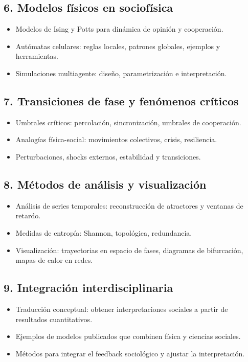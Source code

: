 \documentclass[a4paper,11pt]{article}
\begin{document}
\subsection*{6. Modelos físicos en sociofísica}
\begin{itemize}[leftmargin=*, label=--]
    \item Modelos de Ising y Potts para dinámica de opinión y cooperación.
    \item Autómatas celulares: reglas locales, patrones globales, ejemplos y herramientas.
    \item Simulaciones multiagente: diseño, parametrización e interpretación.
\end{itemize}

\subsection*{7. Transiciones de fase y fenómenos críticos}
\begin{itemize}[leftmargin=*, label=--]
    \item Umbrales críticos: percolación, sincronización, umbrales de cooperación.
    \item Analogías física-social: movimientos colectivos, crisis, resiliencia.
    \item Perturbaciones, shocks externos, estabilidad y transiciones.
\end{itemize}

\subsection*{8. Métodos de análisis y visualización}
\begin{itemize}[leftmargin=*, label=--]
    \item Análisis de series temporales: reconstrucción de atractores y ventanas de retardo.
    \item Medidas de entropía: Shannon, topológica, redundancia.
    \item Visualización: trayectorias en espacio de fases, diagramas de bifurcación, mapas de calor en redes.
\end{itemize}

\subsection*{9. Integración interdisciplinaria}
\begin{itemize}[leftmargin=*, label=--]
    \item Traducción conceptual: obtener interpretaciones sociales a partir de resultados cuantitativos.
    \item Ejemplos de modelos publicados que combinen física y ciencias sociales.
    \item Métodos para integrar el feedback sociológico y ajustar la interpretación.
\end{itemize}
\end{document}

